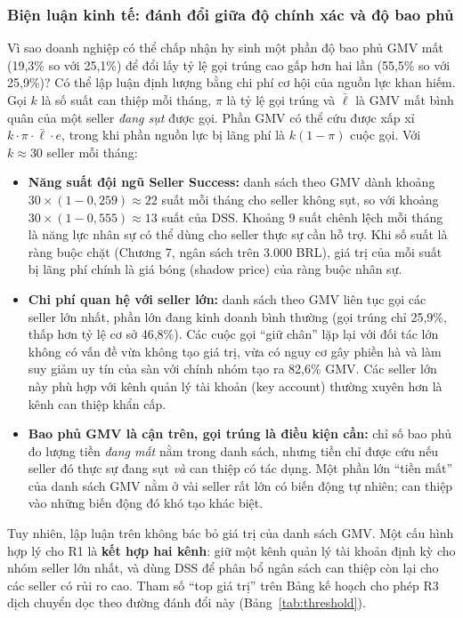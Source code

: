 \subsubsection*{Biện luận kinh tế: đánh đổi giữa độ chính xác và độ bao phủ}
Vì sao doanh nghiệp có thể chấp nhận hy sinh một phần độ bao phủ GMV mất (19,3\% so với 25,1\%) để đổi lấy tỷ lệ gọi trúng cao gấp hơn hai lần (55,5\% so với 25,9\%)? Có thể lập luận định lượng bằng chi phí cơ hội của nguồn lực khan hiếm. Gọi $k$ là số suất can thiệp mỗi tháng, $\pi$ là tỷ lệ gọi trúng và $\bar{\ell}$ là GMV mất bình quân của một seller \emph{đang sụt} được gọi. Phần GMV có thể cứu được xấp xỉ $k \cdot \pi \cdot \bar{\ell} \cdot e$, trong khi phần nguồn lực bị lãng phí là $k(1 - \pi)$ cuộc gọi. Với $k \approx 30$ seller mỗi tháng:
\begin{itemize}
    \item \textbf{Năng suất đội ngũ Seller Success:} danh sách theo GMV dành khoảng $30 \times (1 - 0{,}259) \approx 22$ suất mỗi tháng cho seller không sụt, so với khoảng $30 \times (1 - 0{,}555) \approx 13$ suất của DSS. Khoảng 9 suất chênh lệch mỗi tháng là năng lực nhân sự có thể dùng cho seller thực sự cần hỗ trợ. Khi số suất là ràng buộc chặt (Chương 7, ngân sách trên 3.000 BRL), giá trị của mỗi suất bị lãng phí chính là giá bóng (shadow price) của ràng buộc nhân sự.
    \item \textbf{Chi phí quan hệ với seller lớn:} danh sách theo GMV liên tục gọi các seller lớn nhất, phần lớn đang kinh doanh bình thường (gọi trúng chỉ 25,9\%, thấp hơn tỷ lệ cơ sở 46,8\%). Các cuộc gọi ``giữ chân'' lặp lại với đối tác lớn không có vấn đề vừa không tạo giá trị, vừa có nguy cơ gây phiền hà và làm suy giảm uy tín của sàn với chính nhóm tạo ra 82,6\% GMV. Các seller lớn này phù hợp với kênh quản lý tài khoản (key account) thường xuyên hơn là kênh can thiệp khẩn cấp.
    \item \textbf{Bao phủ GMV là cận trên, gọi trúng là điều kiện cần:} chỉ số bao phủ đo lượng tiền \emph{đang mất} nằm trong danh sách, nhưng tiền chỉ được cứu nếu seller đó thực sự đang sụt \emph{và} can thiệp có tác dụng. Một phần lớn ``tiền mất'' của danh sách GMV nằm ở vài seller rất lớn có biến động tự nhiên; can thiệp vào những biến động đó khó tạo khác biệt.
\end{itemize}
Tuy nhiên, lập luận trên không bác bỏ giá trị của danh sách GMV. Một cấu hình hợp lý cho R1 là \textbf{kết hợp hai kênh}: giữ một kênh quản lý tài khoản định kỳ cho nhóm seller lớn nhất, và dùng DSS để phân bổ ngân sách can thiệp còn lại cho các seller có rủi ro cao. Tham số ``top giá trị'' trên Bảng kế hoạch cho phép R3 dịch chuyển dọc theo đường đánh đổi này (Bảng~\ref{tab:threshold}).

